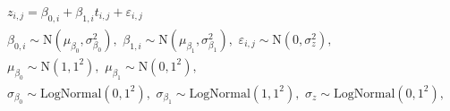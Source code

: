 \begin{equation}
\begin{gathered}
  z_{i, j} = \beta_{0, i} + \beta_{1, i}t_{i, j} + \varepsilon_{i, j} \\
  \beta_{0, i} \sim \text{N}(\mu_{\beta_{0}}, \sigma^{2}_{\beta_{0}}), \,\,
  \beta_{1, i} \sim \text{N}(\mu_{\beta_{1}}, \sigma^{2}_{\beta_{1}}), \,\,
  \varepsilon_{i, j} \sim \text{N}(0, \sigma^{2}_{z}), \\
  \mu_{\beta_{0}} \sim \text{N}(1, 1^2), \,\, 
  \mu_{\beta_{1}} \sim \text{N}(0, 1^2),  \\
  \sigma_{\beta_{0}} \sim \text{LogNormal}(0, 1^2), \,\, 
  \sigma_{\beta_{1}} \sim \text{LogNormal}(1, 1^2), \,\,  
  \sigma_{z} \sim \text{LogNormal}(0, 1^2),
\end{gathered}
\label{eqn:submodel-one-model}
\end{equation}